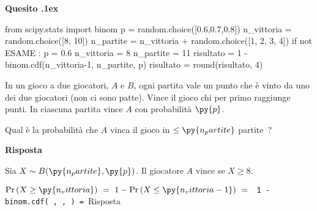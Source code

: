 \documentclass[11pt,twoside,a4paper]{article}
\newcounter{quesito}
\newenvironment{question}{\addtocounter{quesito}{1}\par\textbf{Quesito \thequesito.\kern1ex}}{\vspace{0.5\parskip}}
\newenvironment{answer}{\par\textbf{Risposta\quad}}{\vspace{\parskip}}
\begin{document}
\begin{question}
\def\Pr{{\rm Pr\,}}
\def\Ex{{\rm E\,}}
\def\Var{{\rm Var\,}}
\begin{pycode}
from scipy.stats import binom
p = random.choice([0.6,0.7,0.8])
n_vittoria = random.choice([8, 10])
n_partite = n_vittoria + random.choice([1, 2, 3, 4])
if not ESAME :
   p = 0.6
   n_vittoria = 8
   n_partite = 11
risultato = 1 - binom.cdf(n_vittoria-1, n_partite, p)
risultato = round(risultato, 4)
\end{pycode}
In un gioco a due giocatori, $A$ e $B$, ogni partita vale un punto che è vinto da uno dei due giocatori (non ci sono patte). Vince il gioco chi per primo raggiunge  punti. In ciascuna partita vince $A$ con probabilità $\py{p}$.

Qual è la probabilità che $A$ vinca il gioco in $\le\py{n_partite}$ partite~?
\begin{answer}

Sia $X\sim B(\py{n_partite},\py{p})$. Il giocatore $A$ vince se $X\ge 8$. 

$\displaystyle\Pr(X\ge\py{n_vittoria})\ =\ 1-\Pr( X\le\py{n_vittoria-1} )\ =\ ${\tt{\color{blue} 1 - binom.cdf( , ,  ) }=  }{\color{blue}\hfill Risposta}
\end{answer}
\end{question}
\end{document}
